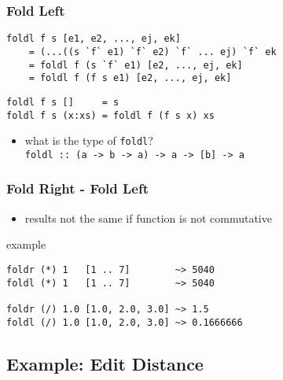 \documentclass[dvipsnames]{beamer}
\theoremstyle{plain}
\begin{document}
\begin{frame}[fragile]
  \frametitle{Fold Left}

  \begin{block}{}
    \begin{lstlisting}
foldl f s [e1, e2, ..., ej, ek]
    = (...((s `f` e1) `f` e2) `f` ... ej) `f` ek
    = foldl f (s `f` e1) [e2, ..., ej, ek]
    = foldl f (f s e1) [e2, ..., ej, ek]
    \end{lstlisting}
  \end{block}

  \pause
  \begin{exampleblock}{}
    \begin{lstlisting}[deletekeywords={foldl}]
foldl f s []     = s
foldl f s (x:xs) = foldl f (f s x) xs
    \end{lstlisting}
  \end{exampleblock}

  \pause
  \begin{itemize}
    \item what is the type of \lstinline|foldl|?\\
      \lstinline|foldl :: (a -> b -> a) -> a -> [b] -> a|
  \end{itemize}
\end{frame}

\begin{frame}[fragile]
  \frametitle{Fold Right - Fold Left}

  \begin{itemize}
    \item results not the same if function is not commutative
  \end{itemize}

  \begin{exampleblock}{example}
    \begin{lstlisting}
foldr (*) 1   [1 .. 7]        ~> 5040
foldl (*) 1   [1 .. 7]        ~> 5040

foldr (/) 1.0 [1.0, 2.0, 3.0] ~> 1.5
foldl (/) 1.0 [1.0, 2.0, 3.0] ~> 0.1666666
    \end{lstlisting}
  \end{exampleblock}
\end{frame}

\subsection{Example: Edit Distance}
\end{document}

